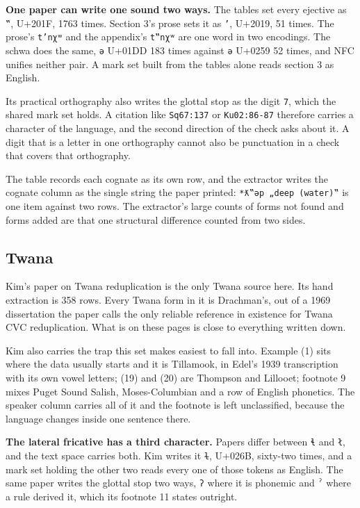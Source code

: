 \textbf{One paper can write one sound two ways.} The tables set every ejective as \texttt{‟}, U+201F, 1763 times. Section 3's prose sets it as \texttt{’}, U+2019, 51 times. The prose's \texttt{t’nχʷ} and the appendix's \texttt{t‟nχʷ} are one word in two encodings. The schwa does the same, \texttt{ǝ} U+01DD 183 times against \texttt{ə} U+0259 52 times, and NFC unifies neither pair. A mark set built from the tables alone reads section 3 as English.

Its practical orthography also writes the glottal stop as the digit \texttt{7}, which the shared mark set holds. A citation like \texttt{Sq67:137} or \texttt{Ku02:86-87} therefore carries a character of the language, and the second direction of the check asks about it. A digit that is a letter in one orthography cannot also be punctuation in a check that covers that orthography.

The table records each cognate as its own row, and the extractor writes the cognate column as the single string the paper printed: \texttt{*ƛ‟ǝp „deep (water)‟} is one item against two rows. The extractor's large counts of forms not found and forms added are that one structural difference counted from two sides.

\subsection{Twana}

Kim's paper on Twana reduplication \cite{src:Kim-2017} is the only Twana source here. Its hand extraction is 358 rows. Every Twana form in it is Drachman's, out of a 1969 dissertation the paper calls the only reliable reference in existence for Twana CVC reduplication. What is on these pages is close to everything written down.

Kim also carries the trap this set makes easiest to fall into. Example (1) sits where the data usually starts and it is Tillamook, in Edel's 1939 transcription with its own vowel letters; (19) and (20) are Thompson and Lillooet; footnote 9 mixes Puget Sound Salish, Moses-Columbian and a row of English phonetics. The speaker column carries all of it and the footnote is left unclassified, because the language changes inside one sentence there.

\textbf{The lateral fricative has a third character.} Papers differ between \texttt{ɬ} and \texttt{ł}, and the text space carries both. Kim writes it \texttt{ɫ}, U+026B, sixty-two times, and a mark set holding the other two reads every one of those tokens as English. The same paper writes the glottal stop two ways, \texttt{ʔ} where it is phonemic and \texttt{ˀ} where a rule derived it, which its footnote 11 states outright.

